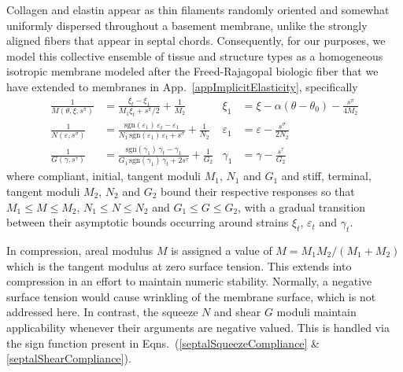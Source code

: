Collagen and elastin appear as thin filaments randomly oriented and somewhat uniformly dispersed throughout a basement membrane, unlike the strongly aligned fibers that appear in septal chords.  Consequently, for our purposes, we model this collective ensemble of tissue and structure types as a homo\-geneous isotropic membrane modeled after the Freed-Rajagopal biologic fiber \cite{FreedRajagopal16} that we have extended to membranes in App.~\ref{appImplicitElasticity}, specifically
\begin{subequations}
    \label{septalCompliances}
    \begin{align}
    \frac{1}{M(\theta, \xi, s^{\pi})} & = 
    \frac{\xi_t - \xi_1}{M_1 \xi_t + s^{\pi} / 2} + \frac{1}{M_2} 
    & \xi_1 & = \xi - \alpha (\theta - \theta_0) - \frac{s^{\pi}}{4M_2}
    \label{septalDilationCompliance} \\
    \frac{1}{N(\varepsilon , s^{\sigma})} & = \frac{ \mathrm{sgn} (\varepsilon_1) \, \varepsilon_t - \varepsilon_1}{N_1 \, \mathrm{sgn} (\varepsilon_1) \, \varepsilon_t + s^{\sigma}} + \frac{1}{N_2} &
    \varepsilon_1 & = \varepsilon - \frac{s^{\sigma}}{2N_2}
    \label{septalSqueezeCompliance} \\
    \frac{1}{G(\gamma , s^{\tau})} & = \frac{ \mathrm{sgn} (\gamma_1) \, \gamma_t - \gamma_1}{G_1 \, \mathrm{sgn} (\gamma_1) \, \gamma_t + 2 s^{\tau}} + \frac{1}{G_2} & 
    \gamma_1 & = \gamma - \frac{s^{\tau}}{G_2}
    \label{septalShearCompliance}
    \end{align}
\end{subequations}
where compliant, initial, tangent moduli $M_1$, $N_1$ and $G_1$ and stiff, terminal, tangent moduli $M_2$, $N_2$ and $G_2$ bound their respective responses so that $M_1 \leq M \leq M_2$, $N_1 \leq N \leq N_2$ and $G_1 \leq G \leq G_2$, with a gradual transition between their asymp\-totic bounds occurring around strains $\xi_t$, $\varepsilon_t$ and $\gamma_t$.

In compression, areal modulus $M$ is assigned a value of $M = M_1 M_2 / ( M_1 + M_2 )$ which is the tangent modulus at zero surface tension.  This extends into compression in an effort to maintain numeric stability.  Normally, a negative surface tension would cause wrinkling of the membrane surface, which is not addressed here.  In contrast, the squeeze $N$ and shear $G$ moduli maintain applicability whenever their arguments are negative valued.  This is handled via the sign function present in Eqns.~(\ref{septalSqueezeCompliance} \& \ref{septalShearCompliance}).

